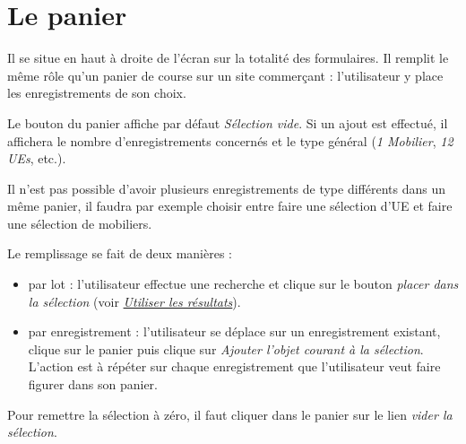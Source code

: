 \documentclass[letterpaper,10pt,french]{sphinxmanual}
\begin{document}
\section{Le panier}
\label{manuel/interface:le-panier}\begin{figure}[htbp]
\centering

\end{figure}

Il se situe en haut à droite de l'écran sur la totalité des formulaires. Il remplit le même rôle qu'un panier de course sur un site commerçant : l'utilisateur y place les enregistrements de son choix.

Le bouton du panier affiche par défaut \emph{Sélection vide}. Si un ajout est effectué, il affichera le nombre d'enregistrements concernés et le type général (\emph{1 Mobilier}, \emph{12 UEs}, etc.).

Il n'est pas possible d'avoir plusieurs enregistrements de type différents dans un même panier, il faudra par exemple choisir entre faire une sélection d'UE et faire une sélection de mobiliers.

Le remplissage se fait de deux manières :
\begin{itemize}
\item {} 
par lot : l'utilisateur effectue une recherche et clique sur le bouton \emph{placer dans la sélection} (voir {\hyperref[manuel/formulaire_recherche:recherche-utilisation]{\emph{Utiliser les résultats}}}).

\item {} 
par enregistrement : l'utilisateur se déplace sur un enregistrement existant, clique sur le panier puis clique sur \emph{Ajouter  l’objet courant à la sélection}. L'action est à répéter sur chaque enregistrement que l'utilisateur veut faire figurer dans son panier.

\end{itemize}

Pour remettre la sélection à zéro, il faut cliquer dans le panier sur le lien \emph{vider la sélection}.
\end{document}
